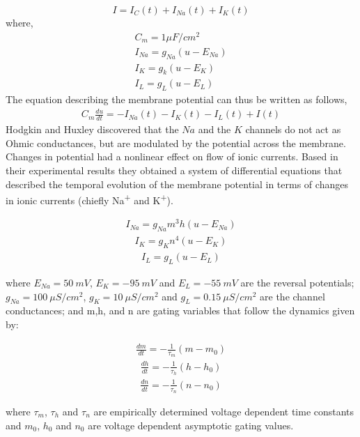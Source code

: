 \documentclass[10pt,letterpaper]{article}
\begin{document}
\begin{nolinenumbers}
\begin{equation}
I = I_{C}(t) + I_{Na}(t) + I_{K}(t)
\end{equation}
where, 
\begin{eqnarray}
C_m = 1 \mu F/cm^2 \\
I_{Na} = g_{Na}(u-E_{Na})\\
I_{K} = g_{k}(u-E_K)\\
I_{L} = g_{L}(u-E_L)
\end{eqnarray}
The equation describing the membrane potential can thus be written as follows,
\begin{eqnarray}
\label{eq:HH}
C_m\frac{du}{dt}=−I_{Na}(t)−I_{K}(t)−I_{L}(t)+I(t)
\end{eqnarray}
Hodgkin and Huxley discovered that the $Na$ and the $K$ channels do not act as Ohmic conductances, but are modulated by the potential across the membrane. 
Changes in potential had a nonlinear effect on flow of ionic currents. Based in their experimental results they obtained a system of differential equations that described the temporal evolution of the membrane potential in terms of changes in ionic currents (chiefly Na\textsuperscript{+} and K\textsuperscript{+}). 

\begin{eqnarray}\label{d3_2}I_{Na} = g_{Na}m^3h(u−E_{Na})\end{eqnarray}
\begin{eqnarray}\label{d3_3}I_K = g_Kn^4(u−E_K)\end{eqnarray}
\begin{eqnarray}\label{d3_4}I_L = g_L(u−E_L)\end{eqnarray}

where $E_{Na}=50\ mV$, $E_K = -95\ mV$ and $E_L=-55\ mV$ are the reversal potentials; $g_{Na} = 100\ \mu S/cm^2$, $g_K = 10\ \mu S/cm^2$ and $g_L = 0.15\ \mu S/cm^2$ are the channel conductances; and m,h, and n are gating variables that follow the dynamics given by:

\begin{eqnarray}\label{d3_5}\frac{dm}{dt} = - \frac{1}{\tau_m}(m-m_0)\end{eqnarray}
\begin{eqnarray}\label{d3_6}\frac{dh}{dt} = - \frac{1}{\tau_h}(h-h_0)\end{eqnarray}
\begin{eqnarray}\label{d3_7}\frac{dn}{dt} = - \frac{1}{\tau_n}(n-n_0)\end{eqnarray}

where $\tau_m$, $\tau_h$ and $\tau_n$ are empirically determined voltage dependent time constants and $m_0$, $h_0$ and $n_0$ are voltage dependent asymptotic gating values.


\end{nolinenumbers}
\end{document}
